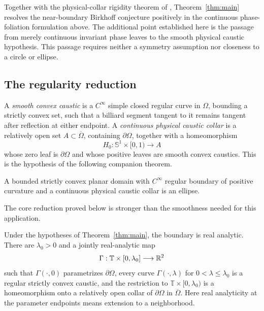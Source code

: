 Together with the physical-collar rigidity theorem of \cite{NB},
Theorem~\ref{thm:main} resolves the near-boundary Birkhoff conjecture
positively in the continuous phase-foliation formulation above.
The additional point established here is the passage from merely
continuous invariant phase leaves to the smooth physical caustic
hypothesis. This passage requires neither a symmetry assumption nor
closeness to a circle or ellipse.

\subsection{The regularity reduction}

A \emph{smooth convex caustic} is a \(C^\infty\) simple closed regular
curve in \(\Omega\), bounding a strictly convex set, such that a billiard
segment tangent to it remains tangent after reflection at either
endpoint. A \emph{continuous physical caustic collar} is a relatively
open set \(A\subset\overline\Omega\), containing \(\partial\Omega\),
together with a homeomorphism
\[
H_0:\mathbb S^1\times[0,1)\longrightarrow A
\]
whose zero leaf is \(\partial\Omega\) and whose positive leaves are smooth
convex caustics. This is the hypothesis of the following companion theorem.

\begin{theorem}
\label{thm:nb-rigidity}
A bounded strictly convex planar domain with \(C^\infty\) regular boundary
of positive curvature and a continuous physical caustic collar is an
ellipse.
\end{theorem}

The core reduction proved below is stronger than the smoothness needed
for this application.

\begin{theorem}
\label{thm:collar-regularity}
Under the hypotheses of Theorem~\ref{thm:main}, the boundary is real
analytic. There are \(\lambda_0>0\) and a jointly real-analytic map
\[
\Gamma:\mathbb T\times[0,\lambda_0]\longrightarrow\mathbb{R}^2
\]
such that \(\Gamma(\cdot,0)\) parametrizes \(\partial\Omega\), every
curve \(\Gamma(\cdot,\lambda)\) for \(0<\lambda\le\lambda_0\) is a regular
strictly convex caustic, and the restriction
to \(\mathbb T\times[0,\lambda_0)\) is a homeomorphism onto a relatively
open collar of \(\partial\Omega\) in \(\overline\Omega\).
Here real analyticity at the parameter endpoints means extension to a
neighborhood.
\end{theorem}

